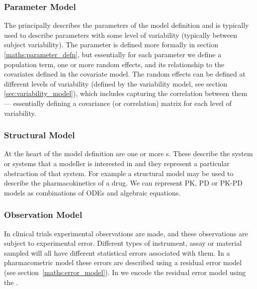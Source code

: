 \subsubsection{Parameter Model}

The  principally describes the parameters of the model
definition and is typically used to describe parameters with some
level of variability (typically between subject variability). The
parameter is defined more formally in section
\ref{maths:parameter_defn}, but essentially for each parameter we
define a population term, one or more random effects, and its
relationship to the covariates defined in the covariate model. The
random effects can be defined at different levels of variability
(defined by the variability model, see section
\ref{sec:variability_model}), which includes capturing the correlation
between them --- essentially defining a covariance (or correlation)
matrix for each level of variability.

\subsubsection{Structural Model}

At the heart of the model definition are one or more s. These describe the system or systems that a modeller is
interested in and they represent a particular abstraction of that
system. For example a structural model may be used to describe the
pharmacokinetics of a drug. We can represent PK, PD or PK-PD models as
combinations of ODEs and algebraic equations.

\subsubsection{Observation Model}

In clinical trials experimental observations are made, and these
observations are subject to experimental error. Different types of
instrument, assay or material sampled will all have different
statistical errors associated with them. In a pharmacometric model
these errors are described using a residual error model (see
section~\ref{maths:error_model}). In \pharmml we encode the residual
error model using the .


